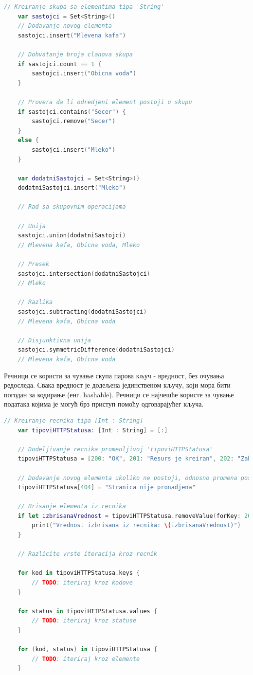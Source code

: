 \documentclass[12pt,oneside]{memoir}
\begin{document}
\begin{lstlisting}[caption=\textit{{Рад са скуповима}}, label={lst:Рад са скуповима}, language=Swift, frame=single]
    // Kreiranje skupa sa elementima tipa 'String'
    var sastojci = Set<String>()
    // Dodavanje novog elementa
    sastojci.insert("Mlevena kafa")
    
    // Dohvatanje broja clanova skupa
    if sastojci.count == 1 {
        sastojci.insert("Obicna voda")
    }
    
    // Provera da li odredjeni element postoji u skupu
    if sastojci.contains("Secer") {
        sastojci.remove("Secer")
    }
    else {
        sastojci.insert("Mleko")
    }
    
    var dodatniSastojci = Set<String>()
    dodatniSastojci.insert("Mleko")
    
    // Rad sa skupovnim operacijama
    
    // Unija
    sastojci.union(dodatniSastojci)
    // Mlevena kafa, Obicna voda, Mleko
    
    // Presek
    sastojci.intersection(dodatniSastojci)
    // Mleko
    
    // Razlika
    sastojci.subtracting(dodatniSastojci)
    // Mlevena kafa, Obicna voda
    
    // Disjunktivna unija
    sastojci.symmetricDifference(dodatniSastojci)
    // Mlevena kafa, Obicna voda
\end{lstlisting}

\indent Речници се користи за чување скупа парова кључ - вредност, без очувања редоследа. Свака вредност је додељена јединственом кључу, који мора бити погодан за кодирање (енг. hashable). Речници се најчешће користе за чување података којима је могућ брз приступ помоћу одговарајућег кључа. 

\begin{lstlisting}[caption=\textit{{Рад са речницима}}, label={lst:Рад са речницима}, language=Swift, frame=single]
    // Kreiranje recnika tipa [Int : String]
    var tipoviHTTPStatusa: [Int : String] = [:]
    
    // Dodeljivanje recnika promenljivoj 'tipoviHTTPStatusa'
    tipoviHTTPStatusa = [200: "OK", 201: "Resurs je kreiran", 202: "Zahtev je prihvacen"]
    
    // Dodavanje novog elementa ukoliko ne postoji, odnosno promena postojeceg
    tipoviHTTPStatusa[404] = "Stranica nije pronadjena"
    
    // Brisanje elementa iz recnika
    if let izbrisanaVrednost = tipoviHTTPStatusa.removeValue(forKey: 201) {
        print("Vrednost izbrisana iz recnika: \(izbrisanaVrednost)")
    }
    
    // Razlicite vrste iteracija kroz recnik
    
    for kod in tipoviHTTPStatusa.keys {
        // TODO: iteriraj kroz kodove
    }
    
    for status in tipoviHTTPStatusa.values {
        // TODO: iteriraj kroz statuse
    }

    for (kod, status) in tipoviHTTPStatusa {
        // TODO: iteriraj kroz elemente
    }
\end{lstlisting}
\end{document}
